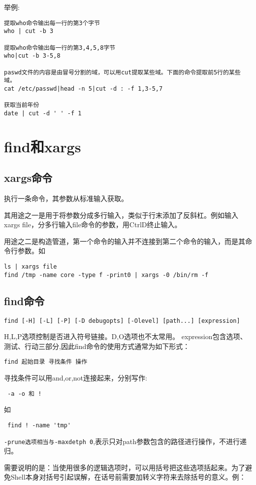 举例:
\begin{verbatim}
提取who命令输出每一行的第3个字节
who | cut -b 3

提取who命令输出每一行的第3,4,5,8字节
who|cut -b 3-5,8

paswd文件的内容是由冒号分割的域，可以用cut提取某些域。下面的命令提取前5行的某些域。
cat /etc/passwd|head -n 5|cut -d : -f 1,3-5,7

获取当前年份
date | cut -d ' ' -f 1

\end{verbatim}
\section{find和xargs}

\subsection{xargs命令}
执行一条命令，其参数从标准输入获取。

其用途之一是用于将参数分成多行输入，类似于行末添加了反斜杠。例如输入xargs file，分多行输入file命令的参数，用CtrlD终止输入。

用途之二是构造管道，第一个命令的输入并不连接到第二个命令的输入，而是其命令行参数。如

\begin{verbatim}
ls | xargs file
find /tmp -name core -type f -print0 | xargs -0 /bin/rm -f
\end{verbatim}

\subsection{find命令}
\begin{verbatim}
find [-H] [-L] [-P] [-D debugopts] [-Olevel] [path...] [expression]
\end{verbatim}
H,L,P选项控制是否进入符号链接。D,O选项也不太常用。
expression包含选项、测试、行动三部分,因此find命令的使用方式通常为如下形式：

\verb+find 起始目录 寻找条件 操作+

寻找条件可以用and,or,not连接起来，分别写作:

\verb+ -a -o 和 !+

如

\verb+ find ! -name 'tmp'+

\verb+-prune选项相当与-maxdetph 0+,表示只对path参数包含的路径进行操作，不进行递归。

需要说明的是：当使用很多的逻辑选项时，可以用括号把这些选项括起来。为了避免Shell本身对括号引起误解，在话号前需要加转义字符来去除括号的意义。例：

